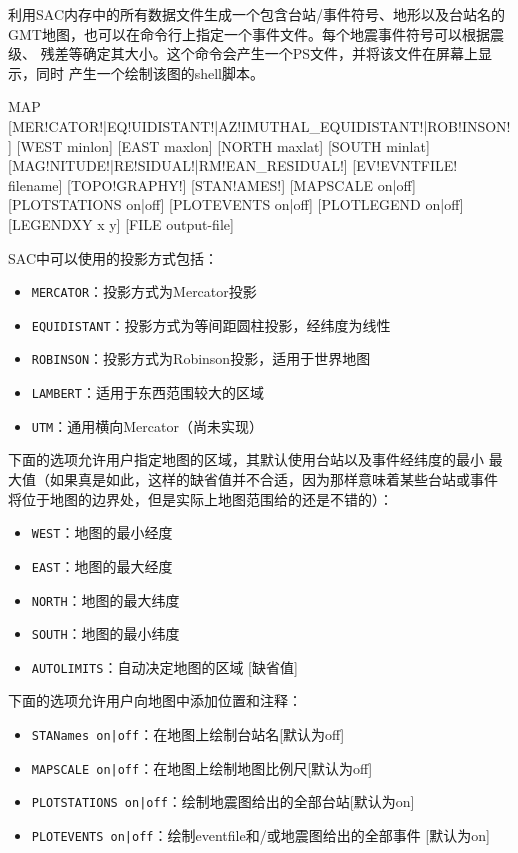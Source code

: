 \label{cmd:map}

利用SAC内存中的所有数据文件生成一个包含台站/事件符号、地形以及台站名的
GMT地图，也可以在命令行上指定一个事件文件。每个地震事件符号可以根据震级、
残差等确定其大小。这个命令会产生一个PS文件，并将该文件在屏幕上显示，同时
产生一个绘制该图的shell脚本。

\begin{SACSTX}
MAP [MER!CATOR!|EQ!UIDISTANT!|AZ!IMUTHAL_EQUIDISTANT!|ROB!INSON!]
    [WEST minlon] [EAST maxlon] [NORTH maxlat] [SOUTH minlat]
    [MAG!NITUDE!|RE!SIDUAL!|RM!EAN_RESIDUAL!] [EV!EVNTFILE! filename]
    [TOPO!GRAPHY!] [STAN!AMES!] [MAPSCALE on|off] [PLOTSTATIONS on|off]
    [PLOTEVENTS on|off] [PLOTLEGEND on|off] [LEGENDXY x y]
    [FILE output-file]
\end{SACSTX}

SAC中可以使用的投影方式包括：
\begin{itemize}
\item \texttt{MERCATOR}：投影方式为Mercator投影
\item \texttt{EQUIDISTANT}：投影方式为等间距圆柱投影，经纬度为线性
\item \texttt{ROBINSON}：投影方式为Robinson投影，适用于世界地图
\item \texttt{LAMBERT}：适用于东西范围较大的区域
\item \texttt{UTM}：通用横向Mercator（尚未实现）
\end{itemize}

下面的选项允许用户指定地图的区域，其默认使用台站以及事件经纬度的最小
最大值（如果真是如此，这样的缺省值并不合适，因为那样意味着某些台站或事件
将位于地图的边界处，但是实际上地图范围给的还是不错的）：
\begin{itemize}
\item \texttt{WEST}：地图的最小经度
\item \texttt{EAST}：地图的最大经度
\item \texttt{NORTH}：地图的最大纬度
\item \texttt{SOUTH}：地图的最小纬度
\item \texttt{AUTOLIMITS}：自动决定地图的区域 [缺省值]
\end{itemize}

下面的选项允许用户向地图中添加位置和注释：
\begin{itemize}
\item \texttt{STANames on|off}：在地图上绘制台站名[默认为off]
\item \texttt{MAPSCALE on|off}：在地图上绘制地图比例尺[默认为off]
\item \texttt{PLOTSTATIONS on|off}：绘制地震图给出的全部台站[默认为on]
\item \texttt{PLOTEVENTS on|off}：绘制eventfile和/或地震图给出的全部事件
    [默认为on]
\end{itemize}

